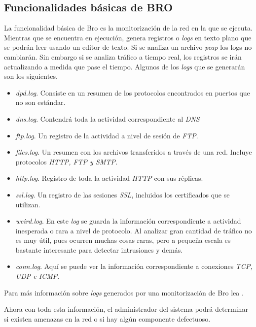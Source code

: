 \subsection{Funcionalidades básicas de BRO}

La funcionalidad básica de Bro es la monitorización de la red en la que se ejecuta. 
Mientras que se encuentra en ejecución, genera registros o \textit{logs} en texto plano que se 
podrán leer usando un editor de texto. Si se analiza un archivo \textit{pcap} los logs no cambiarán. Sin 
embargo si se analiza tráfico a tiempo real, los registros se irán actualizando a medida que pase el tiempo. 
Algunos de los \textit{logs} que se generarán son los siguientes.

\begin{itemize}
\item \textit{dpd.log}. Consiste en un resumen de los protocolos encontrados en puertos que no son estándar.
\item \textit{dns.log}. Contendrá toda la actividad correspondiente al \textit{DNS}
\item \textit{ftp.log}. Un registro de la actividad a nivel de sesión de \textit{FTP}.
\item \textit{files.log}. Un resumen con los archivos transferidos a través de una red. Incluye 
protocolos \textit{HTTP, FTP y SMTP.}
\item \textit{http.log}. Registro de toda la actividad \textit{HTTP} con sus réplicas.
\item \textit{ssl.log}. Un registro de las sesiones \textit{SSL}, incluidos los certificados que se utilizan.
\item \textit{weird.log}. En este \textit{log} se guarda la información correspondiente a actividad 
inesperada o rara a nivel de protocolo. Al analizar gran cantidad de tráfico no es muy útil, pues ocurren 
muchas cosas raras, pero a pequeña escala es bastante interesante para detectar intrusiones y demás.
\item \textit{conn.log}. Aquí se puede ver la información correspondiente a conexiones  \textit{TCP, UDP e ICMP}.
\end{itemize}

\intro Para más información sobre \textit{logs} generados por una monitorización de Bro lea \cite{brologs}.

\intro Ahora con toda esta información, el administrador del sistema podrá determinar si existen amenazas en 
la red o si hay algún componente defectuoso.

